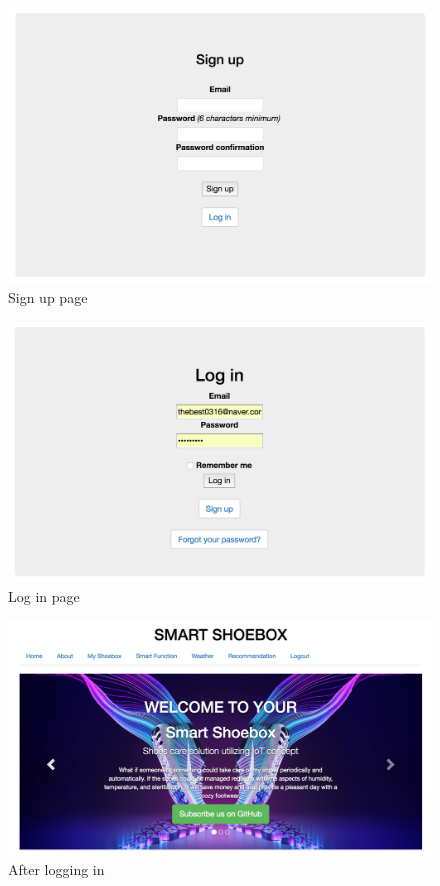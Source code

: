 \documentclass[conference]{IEEEtran}
\begin{document}
\begin{figure}[H]
\begin{center}
    \includegraphics[scale=0.3]{capture1}
     \caption{Sign up page}\label{fig:label}
\end{center}
\end{figure}
\begin{figure}[H]
\begin{center}
    \includegraphics[scale=0.3]{capture2}
     \caption{Log in page}\label{fig:label}
\end{center}
\end{figure}
\begin{figure}[H]
\begin{center}
    \includegraphics[scale=0.25]{capture3}
     \caption{After logging in}\label{fig:label}
\end{center}
\end{figure}
\end{document}
